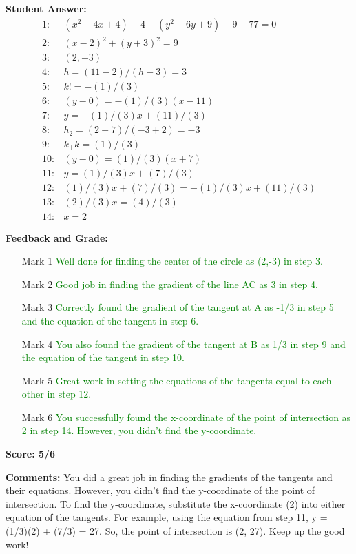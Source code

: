 \documentclass{article}
\begin{document}
\textbf{Student Answer:}
\begin{align*}
1: & (x^{2}-4x+4)-4+(y^{2}+6y+9)-9-77=0 \\
2: & (x-2)^{2}+(y+3)^{2}=9 \\
3: & (2,-3) \\
4: & h=(11-2)/(h-3)=3 \\
5: & k!=-(1)/(3) \\
6: & (y-0)=-(1)/(3)(x-11) \\
7: & y=-(1)/(3)x+(11)/(3) \\
8: & h_2=(2+7)/(-3+2)=-3 \\
9: & k_\perp k=(1)/(3) \\
10: & (y-0)=(1)/(3)(x+7) \\
11: & y=(1)/(3)x+(7)/(3) \\
12: & (1)/(3)x+(7)/(3)=-(1)/(3)x+(11)/(3) \\
13: & (2)/(3)x=(4)/(3) \\
14: & x=2
\end{align*}

\textbf{Feedback and Grade:}
\begin{itemize}
\item[Mark 1] \textcolor{green}{Well done for finding the center of the circle as (2,-3) in step 3.}
\item[Mark 2] \textcolor{green}{Good job in finding the gradient of the line AC as 3 in step 4.}
\item[Mark 3] \textcolor{green}{Correctly found the gradient of the tangent at A as -1/3 in step 5 and the equation of the tangent in step 6.}
\item[Mark 4] \textcolor{green}{You also found the gradient of the tangent at B as 1/3 in step 9 and the equation of the tangent in step 10.}
\item[Mark 5] \textcolor{green}{Great work in setting the equations of the tangents equal to each other in step 12.}
\item[Mark 6] \textcolor{green}{You successfully found the x-coordinate of the point of intersection as 2 in step 14. However, you didn't find the y-coordinate.}
\end{itemize}

\textbf{Score: 5/6}

\textbf{Comments:} You did a great job in finding the gradients of the tangents and their equations. However, you didn't find the y-coordinate of the point of intersection. To find the y-coordinate, substitute the x-coordinate (2) into either equation of the tangents. For example, using the equation from step 11, y = (1/3)(2) + (7/3) = 27. So, the point of intersection is (2, 27). Keep up the good work!
\end{document}
